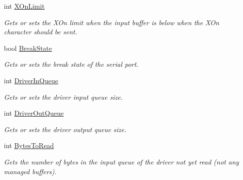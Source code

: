 \begin{DoxyCompactItemize}
int \mbox{\hyperlink{interface_r_j_c_p_1_1_i_o_1_1_ports_1_1_native_1_1_i_native_serial_a8c3484cd56da718abd285e3041538385}{X\+On\+Limit}}
\begin{DoxyCompactList}\small\item\em Gets or sets the X\+On limit when the input buffer is below when the X\+On character should be sent. \end{DoxyCompactList}\item 
bool \mbox{\hyperlink{interface_r_j_c_p_1_1_i_o_1_1_ports_1_1_native_1_1_i_native_serial_aaf396718eeffc0fd76480f986f9613d9}{Break\+State}}
\begin{DoxyCompactList}\small\item\em Gets or sets the break state of the serial port. \end{DoxyCompactList}\item 
int \mbox{\hyperlink{interface_r_j_c_p_1_1_i_o_1_1_ports_1_1_native_1_1_i_native_serial_ab144a51d8c849fb1a5fd6e7fa47cd292}{Driver\+In\+Queue}}
\begin{DoxyCompactList}\small\item\em Gets or sets the driver input queue size. \end{DoxyCompactList}\item 
int \mbox{\hyperlink{interface_r_j_c_p_1_1_i_o_1_1_ports_1_1_native_1_1_i_native_serial_aab5690b25658e043d93b4a19e7b4a3b0}{Driver\+Out\+Queue}}
\begin{DoxyCompactList}\small\item\em Gets or sets the driver output queue size. \end{DoxyCompactList}\item 
int \mbox{\hyperlink{interface_r_j_c_p_1_1_i_o_1_1_ports_1_1_native_1_1_i_native_serial_ac6a2545d83b684b4de2d4613611cbb99}{Bytes\+To\+Read}}
\begin{DoxyCompactList}\small\item\em Gets the number of bytes in the input queue of the driver not yet read (not any managed buffers). \end{DoxyCompactList}\item 

\end{DoxyCompactItemize}
